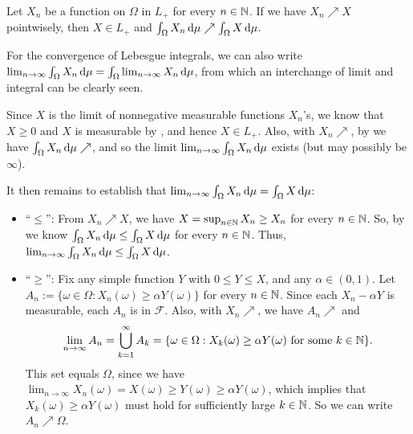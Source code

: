 \begin{enumerate}
\begin{theorem}
\label{thm:mct}
Let \(X_n\) be a function on \(\Omega\) in \(L_{+}\) for every \(n\in\mathbb{N}\). If
we have \(X_n\nearrow X\) pointwisely, then \(X\in L_{+}\) and
\(\int_{\Omega}^{}X_n\odif{\mu}\nearrow\int_{\Omega}^{}X\odif{\mu}\).
\end{theorem}
\begin{note}
For the convergence of Lebesgue integrals, we can also write
\(\lim_{n\to\infty}\int_{\Omega}^{}X_n\odif{\mu}=\int_{\Omega}^{}\lim_{n\to\infty}X_n\odif{\mu}\),
from which an interchange of limit and integral can be clearly seen.
\end{note}

\begin{pf}
Since \(X\) is the limit of nonnegative measurable functions \(X_n\)'s, we know
that \(X\ge 0\) and \(X\) is measurable by
, and hence \(X\in L_{+}\). Also, with \(X_n\nearrow\),
by  we have
\(\int_{\Omega}^{}X_n\odif{\mu}\nearrow\), and so the limit
\(\lim_{n\to \infty}\int_{\Omega}^{}X_n\odif{\mu}\) exists (but may possibly be
\(\infty\)).

It then remains to establish that \(\lim_{n\to
\infty}\int_{\Omega}^{}X_n\odif{\mu}=\int_{\Omega}^{}X\odif{\mu}\):
\begin{itemize}
\item ``\(\le\)'': From \(X_n\nearrow X\), we have \(X=\sup_{n\in\mathbb{N}}X_n\ge
X_n\) for every \(n\in\mathbb{N}\). So, by  we know
\(\int_{\Omega}^{}X_n\odif{\mu}\le\int_{\Omega}^{}X\odif{\mu}\) for every
\(n\in\mathbb{N}\). Thus, \(\lim_{n\to \infty}\int_{\Omega}^{}X_n\odif{\mu} \le
\int_{\Omega}^{}X\odif{\mu}\).
\item ``\(\ge\)'': Fix any simple function \(Y\) with \(0\le Y\le X\), and any
\(\alpha\in(0,1)\). Let \(A_n:=\{\omega\in\Omega:X_n(\omega)\ge \alpha
Y(\omega)\}\) for every \(n\in\mathbb{N}\). Since each \(X_n-\alpha Y\) is measurable,
each \(A_n\) is in \(\mathcal{F}\). Also, with \(X_n\nearrow\), we have
\(A_n\nearrow\) and
\[
\lim_{n\to\infty}A_n=\bigcup_{k=1}^{\infty}A_k
=\{\omega\in\Omega:X_k(\omega)\ge \alpha Y(\omega)\text{ for some \(k\in\mathbb{N}\)}\}.
\]
This set equals \(\Omega\), since we have \(\lim_{n\to\infty}X_n(\omega)=X(\omega)\ge
Y(\omega)\ge \alpha Y(\omega)\), which implies that \(X_k(\omega)\ge \alpha
Y(\omega)\) must hold for sufficiently large \(k\in\mathbb{N}\). So we can write
\(A_n\nearrow \Omega\).


\end{itemize}
\end{pf}
\end{enumerate}
